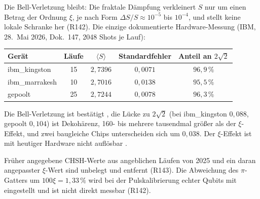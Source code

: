 Die Bell-Verletzung bleibt: Die fraktale Dämpfung verkleinert $S$ nur um einen Betrag der
Ordnung $\xi$, je nach Form $\Delta S/S\approx10^{-5}$ bis $10^{-4}$, und stellt keine lokale
Schranke her (R142). Die einzige dokumentierte Hardware-Messung (IBM, 28.~Mai 2026, Dok.~147,
2048 Shots je Lauf):
\begin{center}
\small
\begin{tabular}{@{}lcccc@{}}
\toprule
\textbf{Gerät} & \textbf{Läufe} & $\langle S\rangle$ & \textbf{Standardfehler} & \textbf{Anteil an }$2\sqrt2$ \\
\midrule
ibm\_kingston & 15 & $2{,}7396$ & $0{,}0071$ & $96{,}9\,\%$ \\
ibm\_marrakesh & 10 & $2{,}7016$ & $0{,}0138$ & $95{,}5\,\%$ \\
gepoolt & 25 & $2{,}7244$ & $0{,}0078$ & $96{,}3\,\%$ \\
\bottomrule
\end{tabular}
\end{center}
\noindent Die Bell-Verletzung ist bestätigt \KM, die Lücke zu $2\sqrt2$ (bei ibm\_kingston
$0{,}088$, gepoolt $0{,}104$) ist Dekohärenz, 160- bis mehrere tausendmal größer als der
$\xi$-Effekt, und zwei baugleiche Chips unterscheiden sich um $0{,}038$. Der $\xi$-Effekt ist mit
heutiger Hardware nicht auflösbar \SM.

Früher angegebene CHSH-Werte aus angeblichen Läufen von
2025 und ein daran angepasster $\xi$-Wert sind unbelegt und entfernt (R143). Die Abweichung des
$\pi$-Gatters um $100\xi=1{,}33\,\%$ wird bei der Pulskalibrierung echter Qubits mit eingestellt
und ist nicht direkt messbar (R142).

